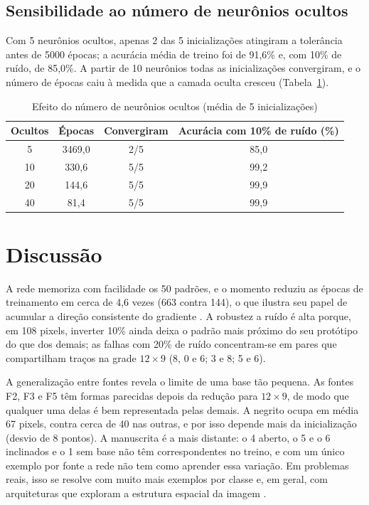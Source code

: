 \documentclass[12pt,a4paper]{article}
\newcommand{\fonte}[1]{\par\vspace{2pt}{\small Fonte: #1}\par}
\begin{document}
\subsection{Sensibilidade ao número de neurônios ocultos}

Com 5 neurônios ocultos, apenas 2 das 5 inicializações atingiram a tolerância antes de 5000
épocas; a acurácia média de treino foi de 91,6\% e, com 10\% de ruído, de 85,0\%. A partir
de 10 neurônios todas as inicializações convergiram, e o número de épocas caiu à medida que
a camada oculta cresceu (Tabela~\ref{tab:sens}).

\begin{table}[H]
  \centering
  \caption{Efeito do número de neurônios ocultos (média de 5 inicializações)}
  \label{tab:sens}
  \begin{tabular}{cccc}
    \toprule
    Ocultos & Épocas & Convergiram & Acurácia com 10\% de ruído (\%) \\
    \midrule
    5  & 3469,0 & 2/5 & 85,0 \\
    10 & 330,6  & 5/5 & 99,2 \\
    20 & 144,6  & 5/5 & 99,9 \\
    40 & 81,4   & 5/5 & 99,9 \\
    \bottomrule
  \end{tabular}
  \fonte{elaborada pelo autor (2026).}
\end{table}

\section{Discussão}

A rede memoriza com facilidade os 50 padrões, e o momento reduziu as épocas de treinamento
em cerca de 4,6 vezes (663 contra 144), o que ilustra seu papel de acumular a direção
consistente do gradiente \cite{haykin2009}. A robustez a ruído é alta porque, em 108
pixels, inverter 10\% ainda deixa o padrão mais próximo do seu protótipo do que dos
demais; as falhas com 20\% de ruído concentram-se em pares que compartilham traços na
grade $12\times9$ (8, 0 e 6; 3 e 8; 5 e 6).

A generalização entre fontes revela o limite de uma base tão pequena. As fontes F2, F3 e F5
têm formas parecidas depois da redução para $12\times9$, de modo que qualquer uma delas é
bem representada pelas demais. A negrito ocupa em média 67 pixels, contra cerca de 40 nas
outras, e por isso depende mais da inicialização (desvio de 8 pontos). A manuscrita é a
mais distante: o 4 aberto, o 5 e o 6 inclinados e o 1 sem base não têm correspondentes no
treino, e com um único exemplo por fonte a rede não tem como aprender essa variação. Em
problemas reais, isso se resolve com muito mais exemplos por classe e, em geral, com
arquiteturas que exploram a estrutura espacial da imagem \cite{lecun1998}.
\end{document}
